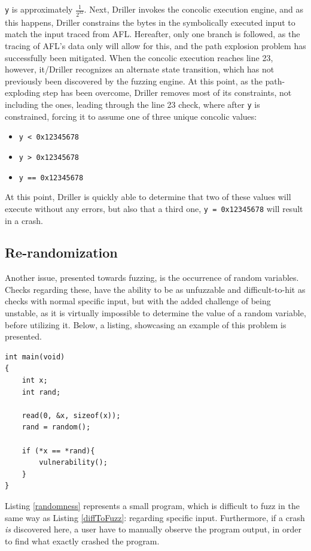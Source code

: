 \documentclass[a4paper]{article}
\newcommand{\tit}[1]{\textit{#1}}
\newcommand{\ttt}[1]{\texttt{#1}}
\begin{document}
\ttt{y} is approximately $\frac{1}{2^{32}}$. Next, Driller invokes the concolic execution engine, and as this happens, Driller constrains the bytes in the symbolically executed input to match the input traced from AFL. Hereafter, only one branch is followed, as the tracing of AFL's data only will allow for this, and the path explosion problem has successfully been mitigated. When the concolic execution reaches line 23, however, it/Driller recognizes an alternate state transition, which has not previously been discovered by the fuzzing engine. At this point, as the path-exploding step has been overcome, Driller removes most of its constraints, not including the ones, leading through the line 23 check, where after \ttt{y} is constrained, forcing it to assume one of three unique concolic values:
\begin{itemize}[noitemsep]
	\item \ttt{y < 0x12345678}
	\item \ttt{y > 0x12345678}
	\item \ttt{y == 0x12345678}
\end{itemize}
At this point, Driller is quickly able to determine that two of these values will execute without any errors, but also that a third one, \ttt{y = 0x12345678} will result in a crash. 
\subsection{Re-randomization}
Another issue, presented towards fuzzing, is the occurrence of random variables. Checks regarding these, have the ability to be as unfuzzable and difficult-to-hit as checks with normal specific input, but with the added challenge of being unstable, as it is virtually impossible to determine the value of a random variable, before utilizing it. Below, a listing, showcasing an example of this problem is presented.
\begin{lstlisting}[caption=A program featuring randomness,
label=randomness, captionpos=b]
int main(void)
{
    int x;
    int rand;
    
    read(0, &x, sizeof(x));
    rand = random();
    
    if (*x == *rand){
        vulnerability();
    }
}
\end{lstlisting}
Listing \ref{randomness} represents a small program, which is difficult to fuzz in the same way as Listing \ref{diffToFuzz}: regarding specific input. Furthermore, if a crash \tit{is} discovered here, a user have to manually observe the program output, in order to find what exactly crashed the program.
\end{document}
